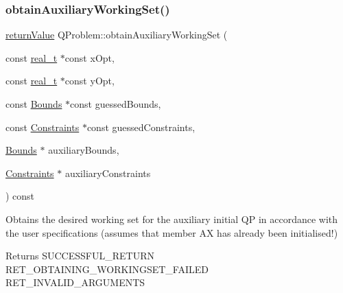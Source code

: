 \subsubsection{\texorpdfstring{obtain\+Auxiliary\+Working\+Set()}{obtainAuxiliaryWorkingSet()}}
{\footnotesize\ttfamily \hyperlink{_message_handling_8hpp_a81d556f613bfbabd0b1f9488c0fa865e}{return\+Value} Q\+Problem\+::obtain\+Auxiliary\+Working\+Set (\begin{DoxyParamCaption}\item[{const \hyperlink{qp_o_a_s_e_s__wrapper_8h_a0d00e2b3dfadee81331bbb39068570c4}{real\+\_\+t} $\ast$const}]{x\+Opt,  }\item[{const \hyperlink{qp_o_a_s_e_s__wrapper_8h_a0d00e2b3dfadee81331bbb39068570c4}{real\+\_\+t} $\ast$const}]{y\+Opt,  }\item[{const \hyperlink{class_bounds}{Bounds} $\ast$const}]{guessed\+Bounds,  }\item[{const \hyperlink{class_constraints}{Constraints} $\ast$const}]{guessed\+Constraints,  }\item[{\hyperlink{class_bounds}{Bounds} $\ast$}]{auxiliary\+Bounds,  }\item[{\hyperlink{class_constraints}{Constraints} $\ast$}]{auxiliary\+Constraints }\end{DoxyParamCaption}) const\hspace{0.3cm}{\ttfamily [protected]}}

Obtains the desired working set for the auxiliary initial QP in accordance with the user specifications (assumes that member AX has already been initialised!) \begin{DoxyReturn}{Returns}
S\+U\+C\+C\+E\+S\+S\+F\+U\+L\+\_\+\+R\+E\+T\+U\+RN ~\newline
 R\+E\+T\+\_\+\+O\+B\+T\+A\+I\+N\+I\+N\+G\+\_\+\+W\+O\+R\+K\+I\+N\+G\+S\+E\+T\+\_\+\+F\+A\+I\+L\+ED ~\newline
 R\+E\+T\+\_\+\+I\+N\+V\+A\+L\+I\+D\+\_\+\+A\+R\+G\+U\+M\+E\+N\+TS 
\end{DoxyReturn}

